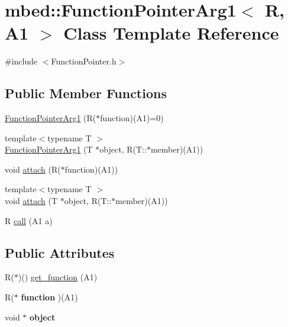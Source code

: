 \hypertarget{classmbed_1_1FunctionPointerArg1}{}\section{mbed\+:\+:Function\+Pointer\+Arg1$<$ R, A1 $>$ Class Template Reference}
\label{classmbed_1_1FunctionPointerArg1}


{\ttfamily \#include $<$Function\+Pointer.\+h$>$}

\subsection*{Public Member Functions}
\begin{DoxyCompactItemize}
\item 
\hyperlink{classmbed_1_1FunctionPointerArg1_aef73e45314e689bde71cd7b59f80fc04}{Function\+Pointer\+Arg1} (R($\ast$function)(A1)=0)
\item 
{\footnotesize template$<$typename T $>$ }\\\hyperlink{classmbed_1_1FunctionPointerArg1_abb818b9698a16c20dd8c0335e7f21c4f}{Function\+Pointer\+Arg1} (T $\ast$object, R(T\+::$\ast$member)(A1))
\item 
void \hyperlink{classmbed_1_1FunctionPointerArg1_a2a0103808b31aea189f37d88b6156ef8}{attach} (R($\ast$function)(A1))
\item 
{\footnotesize template$<$typename T $>$ }\\void \hyperlink{classmbed_1_1FunctionPointerArg1_a0a982633121d38ac036475d0e5456ab9}{attach} (T $\ast$object, R(T\+::$\ast$member)(A1))
\item 
R \hyperlink{classmbed_1_1FunctionPointerArg1_a49eb4fa6221746c3fd3d5a04fbcd5563}{call} (A1 a)
\end{DoxyCompactItemize}
\subsection*{Public Attributes}
\begin{DoxyCompactItemize}
\item 
R($\ast$)() \hyperlink{classmbed_1_1FunctionPointerArg1_a8dfc6095837c03196cf8027faf680c25}{get\+\_\+function} (A1)
\item 
R($\ast$ {\bfseries function} )(A1)\hypertarget{classmbed_1_1FunctionPointerArg1_a864fc1a43819b975c3cf767ae30041ac}{}\label{classmbed_1_1FunctionPointerArg1_a864fc1a43819b975c3cf767ae30041ac}

\item 
void $\ast$ {\bfseries object}\hypertarget{classmbed_1_1FunctionPointerArg1_a548c7abc27a7ed8f2b119940841fdb57}{}\label{classmbed_1_1FunctionPointerArg1_a548c7abc27a7ed8f2b119940841fdb57}

\end{DoxyCompactItemize}


